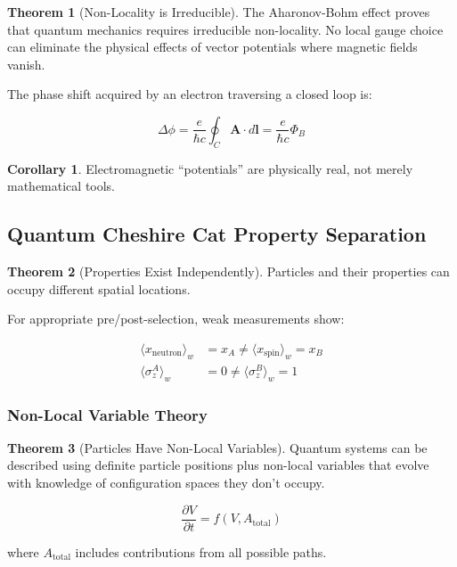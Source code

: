 \documentclass[12pt,a4paper]{article}
\theoremstyle{definition}
\newtheorem{theorem}{Theorem}[section]
\newtheorem{corollary}{Corollary}[section]
\begin{document}
\begin{theorem}[Non-Locality is Irreducible]
The Aharonov-Bohm effect proves that quantum mechanics requires irreducible non-locality. No local gauge choice can eliminate the physical effects of vector potentials where magnetic fields vanish.

The phase shift acquired by an electron traversing a closed loop is:

\begin{equation}
\Delta\phi = \frac{e}{\hbar c} \oint_C \mathbf{A} \cdot d\mathbf{l} = \frac{e}{\hbar c} \Phi_B
\end{equation}
\end{theorem}

\begin{corollary}
Electromagnetic ``potentials'' are physically real, not merely mathematical tools.
\end{corollary}

\subsection{Quantum Cheshire Cat Property Separation}

\begin{theorem}[Properties Exist Independently]
Particles and their properties can occupy different spatial locations.

For appropriate pre/post-selection, weak measurements show:

\begin{align}
\langle x_{\text{neutron}} \rangle_w &= x_A \not= \langle x_{\text{spin}} \rangle_w = x_B \\
\langle \sigma_z^A \rangle_w &= 0 \neq \langle \sigma_z^B \rangle_w = 1
\end{align}
\end{theorem}

\subsubsection{Non-Local Variable Theory}
\begin{theorem}[Particles Have Non-Local Variables]
Quantum systems can be described using definite particle positions plus non-local variables that evolve with knowledge of configuration spaces they don't occupy.

\begin{equation}
\frac{\partial V}{\partial t} = f(V, A_{\text{total}})
\end{equation}

where $A_{\text{total}}$ includes contributions from all possible paths.
\end{theorem}
\end{document}

